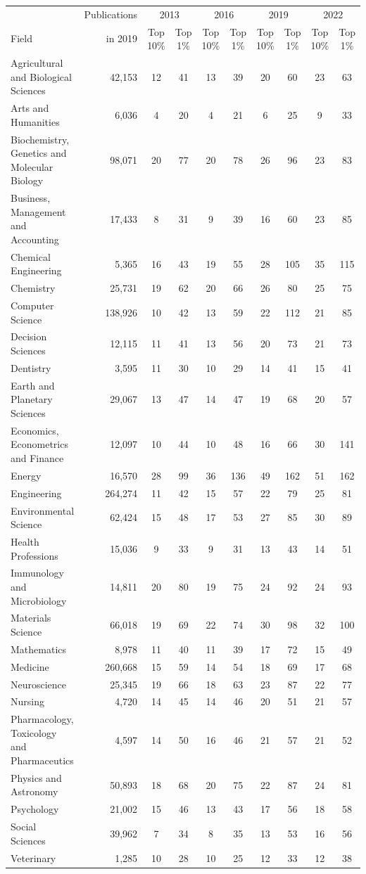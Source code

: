\begin{tabular}{lrcccccccc}
\toprule
 & Publications & \multicolumn{2}{c}{2013} & \multicolumn{2}{c}{2016} & \multicolumn{2}{c}{2019} & \multicolumn{2}{c}{2022} \\
Field & in 2019 & Top 10\% & Top 1\% & Top 10\% & Top 1\% & Top 10\% & Top 1\% & Top 10\% & Top 1\% \\
\midrule
Agricultural and Biological Sciences & 42,153 & 12 & 41 & 13 & 39 & 20 & 60 & 23 & 63 \\
Arts and Humanities & 6,036 & 4 & 20 & 4 & 21 & 6 & 25 & 9 & 33 \\
Biochemistry, Genetics and Molecular Biology & 98,071 & 20 & 77 & 20 & 78 & 26 & 96 & 23 & 83 \\
Business, Management and Accounting & 17,433 & 8 & 31 & 9 & 39 & 16 & 60 & 23 & 85 \\
Chemical Engineering & 5,365 & 16 & 43 & 19 & 55 & 28 & 105 & 35 & 115 \\
Chemistry & 25,731 & 19 & 62 & 20 & 66 & 26 & 80 & 25 & 75 \\
Computer Science & 138,926 & 10 & 42 & 13 & 59 & 22 & 112 & 21 & 85 \\
Decision Sciences & 12,115 & 11 & 41 & 13 & 56 & 20 & 73 & 21 & 73 \\
Dentistry & 3,595 & 11 & 30 & 10 & 29 & 14 & 41 & 15 & 41 \\
Earth and Planetary Sciences & 29,067 & 13 & 47 & 14 & 47 & 19 & 68 & 20 & 57 \\
Economics, Econometrics and Finance & 12,097 & 10 & 44 & 10 & 48 & 16 & 66 & 30 & 141 \\
Energy & 16,570 & 28 & 99 & 36 & 136 & 49 & 162 & 51 & 162 \\
Engineering & 264,274 & 11 & 42 & 15 & 57 & 22 & 79 & 25 & 81 \\
Environmental Science & 62,424 & 15 & 48 & 17 & 53 & 27 & 85 & 30 & 89 \\
Health Professions & 15,036 & 9 & 33 & 9 & 31 & 13 & 43 & 14 & 51 \\
Immunology and Microbiology & 14,811 & 20 & 80 & 19 & 75 & 24 & 92 & 24 & 93 \\
Materials Science & 66,018 & 19 & 69 & 22 & 74 & 30 & 98 & 32 & 100 \\
Mathematics & 8,978 & 11 & 40 & 11 & 39 & 17 & 72 & 15 & 49 \\
Medicine & 260,668 & 15 & 59 & 14 & 54 & 18 & 69 & 17 & 68 \\
Neuroscience & 25,345 & 19 & 66 & 18 & 63 & 23 & 87 & 22 & 77 \\
Nursing & 4,720 & 14 & 45 & 14 & 46 & 20 & 51 & 21 & 57 \\
Pharmacology, Toxicology and Pharmaceutics & 4,597 & 14 & 50 & 16 & 46 & 21 & 57 & 21 & 52 \\
Physics and Astronomy & 50,893 & 18 & 68 & 20 & 75 & 22 & 87 & 24 & 81 \\
Psychology & 21,002 & 15 & 46 & 13 & 43 & 17 & 56 & 18 & 58 \\
Social Sciences & 39,962 & 7 & 34 & 8 & 35 & 13 & 53 & 16 & 56 \\
Veterinary & 1,285 & 10 & 28 & 10 & 25 & 12 & 33 & 12 & 38 \\
\bottomrule
\end{tabular}
